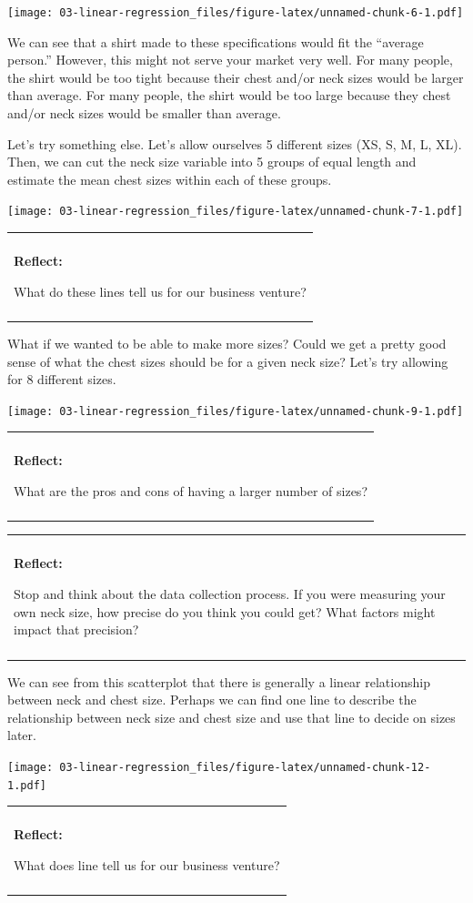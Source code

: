 \documentclass[
]{book}
\newenvironment{reflect}
{
    \begin{center}
    
    \begin{tabular}{|p{0.8\textwidth}|}
    \rowcolor{LightBlue}
    \hline\\
    \rowcolor{LightBlue}
    \textbf{Reflect:}
}
{
    \\\rowcolor{LightBlue}
    \\\hline
    \end{tabular} 
    \end{center}
}
\begin{document}
\texttt{[image: 03-linear-regression\_files/figure-latex/unnamed-chunk-6-1.pdf]}

We can see that a shirt made to these specifications would fit the ``average person.'' However, this might not serve your market very well. For many people, the shirt would be too tight because their chest and/or neck sizes would be larger than average. For many people, the shirt would be too large because they chest and/or neck sizes would be smaller than average.

Let's try something else. Let's allow ourselves 5 different sizes (XS, S, M, L, XL). Then, we can cut the neck size variable into 5 groups of equal length and estimate the mean chest sizes within each of these groups.

\texttt{[image: 03-linear-regression\_files/figure-latex/unnamed-chunk-7-1.pdf]}

\begin{reflect}
What do these lines tell us for our business venture?
\end{reflect}

What if we wanted to be able to make more sizes? Could we get a pretty good sense of what the chest sizes should be for a given neck size? Let's try allowing for 8 different sizes.

\texttt{[image: 03-linear-regression\_files/figure-latex/unnamed-chunk-9-1.pdf]}

\begin{reflect}
What are the pros and cons of having a larger number of sizes?
\end{reflect}

\begin{reflect}
Stop and think about the data collection process. If you were measuring
your own neck size, how precise do you think you could get? What factors
might impact that precision?
\end{reflect}

We can see from this scatterplot that there is generally a linear relationship between neck and chest size. Perhaps we can find one line to describe the relationship between neck size and chest size and use that line to decide on sizes later.

\texttt{[image: 03-linear-regression\_files/figure-latex/unnamed-chunk-12-1.pdf]}

\begin{reflect}
What does line tell us for our business venture?
\end{reflect}
\end{document}
